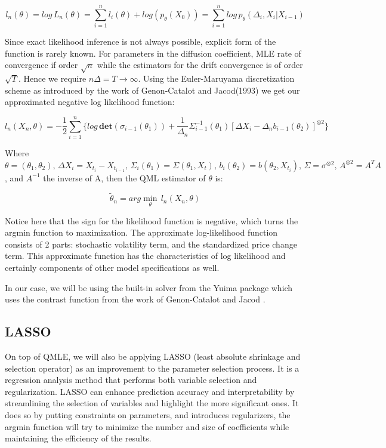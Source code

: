 \begin{spacing}{1.5}
$$
l_n(\theta)=log\,L_n(\theta)=\sum_{i=1}^n l_i(\theta)+log(p_{\theta}(X_0))=\sum_{i=1}^n log\,p_{\theta}(\Delta_i,X_i |X_{i-1})
$$

Since exact likelihood inference is not always possible, explicit form of the function is rarely known. For parameters in the diffusion coefficient, MLE rate of convergence if order $\sqrt{n}$ while the estimators for the drift convergence is of order $\sqrt{T}$. Hence we require $n\Delta=T \to \infty$. Using the Euler-Maruyama discretization scheme as introduced by the work of Genon-Catalot and Jacod(1993) we get our approximated negative log likelihood function:

$$
l_n(X_n,\theta) = -\frac{1}{2}\sum_{i=1}^{n}\{ log \,\textbf{det}(\sigma_{i-1}(\theta_1)) + \frac{1}{\Delta_n}\Sigma_{i-1}^{-1}(\theta_1)[\Delta X_i-\Delta_n b_{i-1}(\theta_2)]^{\otimes 2} \}
$$

Where $\theta=(\theta_1,\theta_2),\, \Delta X_i = X_{t_i}-X_{t_{i-1}},\, \Sigma_i(\theta_1) = \Sigma(\theta_1,X_t),\, b_i(\theta_2)=b(\theta_2,X_{t_i}),\, \Sigma=\sigma^{\otimes 2},\, A^{\otimes 2}=A^TA$, and $A^{-1}$ the inverse of A, then the QML estimator of $\theta$ is:

$$
\tilde{\theta}_n = arg\min_{\theta}\, l_n(X_n,\theta)
$$

Notice here that the sign for the likelihood function is negative, which turns the argmin function to maximization. The approximate log-likelihood function consists of 2 parts: stochastic volatility term, and the standardized price change term. This approximate function has the characteristics of log likelihood and certainly components of other model specifications as well.

In our case, we will be using the built-in solver from the Yuima package which uses the contrast function from the work of Genon-Catalot and Jacod \cite{genon1993estimation}.

\subsection{LASSO}
On top of QMLE, we will also be applying LASSO (least absolute shrinkage and selection operator) as an improvement to the parameter selection process. It is a regression analysis method that performs both variable selection and regularization. LASSO can enhance prediction accuracy and interpretability by streamlining the selection of variables and highlight the more significant ones. It does so by putting constraints on parameters, and introduces regularizers, the argmin function will try to minimize the number and size of coefficients while maintaining the efficiency of the results.


\end{spacing}
